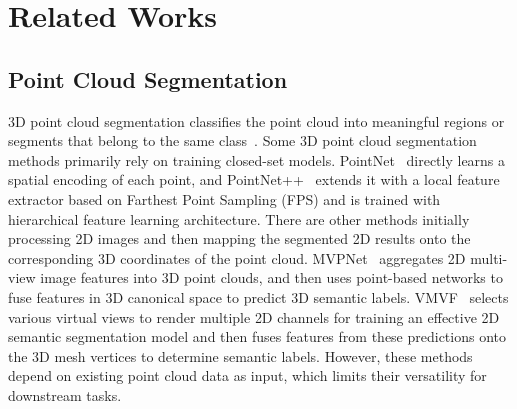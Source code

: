 \section{Related Works}
\subsection{Point Cloud Segmentation}
3D point cloud segmentation classifies the point cloud into meaningful regions or segments that belong to the same class~\cite{tang2022contrastive,park2022fast,peng2023openscene}. Some 3D point cloud segmentation methods primarily rely on training closed-set models. PointNet~\cite{qi2017pointnet} directly learns a spatial encoding of each point, and PointNet++~\cite{qi2017pointnet++} extends it with a local feature extractor based on Farthest Point Sampling (FPS) and is trained with hierarchical feature learning architecture. There are other methods initially processing 2D images and then mapping the segmented 2D results onto the corresponding 3D coordinates of the point cloud. MVPNet~\cite{jaritz2019multi} aggregates 2D multi-view image features into 3D point clouds, and then uses point-based networks to fuse features in 3D canonical space to predict 3D semantic labels. VMVF~\cite{kundu2020virtual} selects various virtual views to render multiple 2D channels for training an effective 2D semantic segmentation model and then fuses features from these predictions onto the 3D mesh vertices to determine semantic labels. However, these methods depend on existing point cloud data as input, which limits their versatility for downstream tasks.
